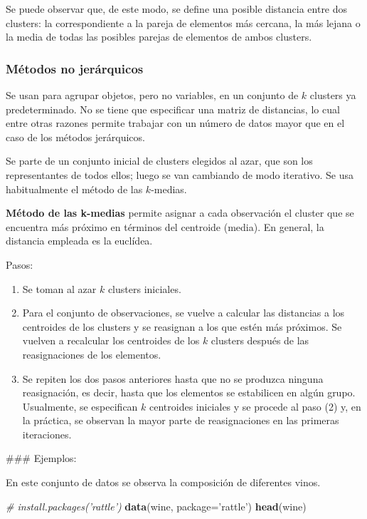 \documentclass[]{article}
\newenvironment{Shaded}{\begin{snugshade}}{\end{snugshade}}
\newcommand{\KeywordTok}[1]{\textcolor[rgb]{0.13,0.29,0.53}{\textbf{{#1}}}}
\newcommand{\DataTypeTok}[1]{\textcolor[rgb]{0.13,0.29,0.53}{{#1}}}
\newcommand{\StringTok}[1]{\textcolor[rgb]{0.31,0.60,0.02}{{#1}}}
\newcommand{\CommentTok}[1]{\textcolor[rgb]{0.56,0.35,0.01}{\textit{{#1}}}}
\newcommand{\NormalTok}[1]{{#1}}
\numberwithin{equation}{section}
\begin{document}
Se puede observar que, de este modo, se define una posible distancia
entre dos clusters: la correspondiente a la pareja de elementos más
cercana, la más lejana o la media de todas las posibles parejas de
elementos de ambos clusters.

\subsubsection{Métodos no jerárquicos}\label{metodos-no-jerarquicos}

Se usan para agrupar objetos, pero no variables, en un conjunto de \(k\)
clusters ya predeterminado. No se tiene que especificar una matriz de
distancias, lo cual entre otras razones permite trabajar con un número
de datos mayor que en el caso de los métodos jerárquicos.

Se parte de un conjunto inicial de clusters elegidos al azar, que son
los representantes de todos ellos; luego se van cambiando de modo
iterativo. Se usa habitualmente el método de las \(k\)-medias.

\textbf{Método de las k-medias} permite asignar a cada observación el
cluster que se encuentra más próximo en términos del centroide (media).
En general, la distancia empleada es la euclídea.

Pasos:

\begin{enumerate}
\def\labelenumi{\arabic{enumi}.}
\item
  Se toman al azar \(k\) clusters iniciales.
\item
  Para el conjunto de observaciones, se vuelve a calcular las distancias
  a los centroides de los clusters y se reasignan a los que estén más
  próximos. Se vuelven a recalcular los centroides de los \(k\) clusters
  después de las reasignaciones de los elementos.
\item
  Se repiten los dos pasos anteriores hasta que no se produzca ninguna
  reasignación, es decir, hasta que los elementos se estabilicen en
  algún grupo. Usualmente, se especifican \(k\) centroides iniciales y
  se procede al paso (2) y, en la práctica, se observan la mayor parte
  de reasignaciones en las primeras iteraciones.
\end{enumerate}

\#\#\# Ejemplos:

En este conjunto de datos se observa la composición de diferentes vinos.

\begin{Shaded}
\begin{Highlighting}[]
\CommentTok{# install.packages('rattle')}
\KeywordTok{data}\NormalTok{(wine, }\DataTypeTok{package=}\StringTok{'rattle'}\NormalTok{)}
\KeywordTok{head}\NormalTok{(wine)}
\end{Highlighting}
\end{Shaded}
\end{document}
